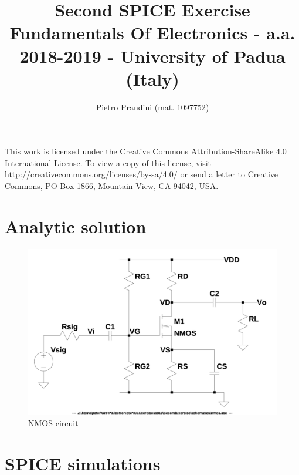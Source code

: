 \documentclass[10pt,a4paper]{book}
\title{Second SPICE Exercise\\{\small{Fundamentals Of Electronics - a.a. 2018-2019 -
University of Padua (Italy)}}}
\author{Pietro Prandini (mat. 1097752)}
\begin{document}
\maketitle

\vspace*{\fill}
\begin{center}
\tiny{This work is licensed under the Creative Commons Attribution-ShareAlike 4.0 International License. To view a copy of this license, visit \href{http://creativecommons.org/licenses/by-sa/4.0/}{http://creativecommons.org/licenses/by-sa/4.0/} or send a letter to Creative Commons, PO Box 1866, Mountain View, CA 94042, USA.}
\end{center}

\tableofcontents

\chapter{Analytic solution}

\begin{figure}[h]
  \centering
  \includegraphics[width=12cm]{schematics/nmos.jpg}
  \caption{NMOS circuit}
  \label{nmos}
\end{figure}



\chapter{SPICE simulations}
\end{document}
